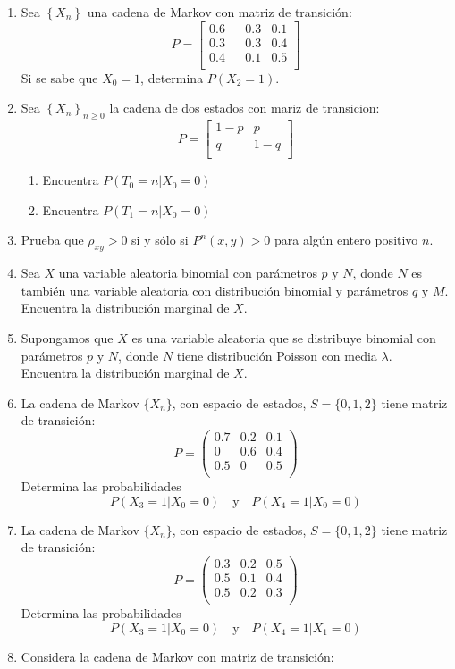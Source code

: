 \documentclass[12pt]{report}
\begin{document}
\begin{enumerate}
\item Sea $\left\{X_n\right\}$ una cadena de Markov con matriz de transición:
$$P= \left[
    \begin{matrix}
        0.6 & & 0.3 & 0.1 \\
        0.3 & & 0.3 & 0.4 \\
        0.4 & & 0.1 & 0.5 \\
    \end{matrix}
    \right]
$$
Si se sabe que $X_0=1$, determina $P(X_2 = 1)$.
\item Sea $\left\{X_n\right\}_{n\geq 0}$ la cadena de dos estados con mariz de transicion:
$$P= \left[
    \begin{matrix}
        1-p &  p \\
        q   &  1-q \\
    \end{matrix}
    \right]
$$
\begin{enumerate}
    \item Encuentra $P(\left. T_0=n\right\vert X_0=0)$
    \item Encuentra $P(\left. T_1=n\right\vert X_0=0)$
\end{enumerate}
\item Prueba que $\rho_{xy}>0$ si y sólo si $P^n(x,y)>0$ para algún entero positivo $n$.
\item Sea $X$ una variable aleatoria binomial con parámetros $p$ y $N$, donde $N$ es también una variable aleatoria con distribución binomial y parámetros $q$ y $M$. Encuentra la distribución marginal de $X$.
\item Supongamos que $X$ es una variable aleatoria que se distribuye binomial con parámetros $p$ y $N$, donde $N$ tiene distribución Poisson con media $\lambda$. Encuentra la distribución marginal de $X$. 
\item La cadena de Markov $\{X_n\}$, con espacio de estados, $S =\{0,1,2\}$ tiene matriz de transición:
$$
P = \left(\begin{matrix}
	0 .7 & 0.2 & 0.1 \\
	0    & 0.6 & 0.4 \\
	0 .5 & 0  & 0.5 \\
\end{matrix}\right)
$$
Determina las probabilidades 
$$
P(X_3=1\vert X_0=0)\quad \mbox{y}\quad P(X_4=1\vert X_0=0)
$$
\item La cadena de Markov $\{X_n\}$, con espacio de estados, $S =\{0,1,2\}$ tiene matriz de transición:
$$
P = \left(\begin{matrix}
	0 .3 & 0.2 & 0.5 \\
	0.5  & 0.1 & 0.4 \\
	0 .5 & 0.2  & 0.3 \\
\end{matrix}\right)
$$
Determina las probabilidades 
$$
P(X_3=1\vert X_0=0)\quad \mbox{y}\quad P(X_4=1\vert X_1=0)
$$
\item Considera la cadena de Markov con matriz de transición:


\end{enumerate}
\end{document}
